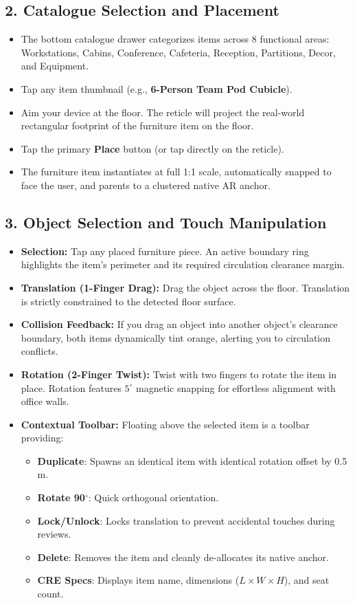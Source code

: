 \documentclass[11pt,a4paper]{article}
\begin{document}
\subsection{2. Catalogue Selection and Placement}
\begin{itemize}
    \item The bottom catalogue drawer categorizes items across 8 functional areas: Workstations, Cabins, Conference, Cafeteria, Reception, Partitions, Decor, and Equipment.
    \item Tap any item thumbnail (e.g., \textbf{6-Person Team Pod Cubicle}).
    \item Aim your device at the floor. The reticle will project the real-world rectangular footprint of the furniture item on the floor.
    \item Tap the primary \textbf{Place} button (or tap directly on the reticle).
    \item The furniture item instantiates at full 1:1 scale, automatically snapped to face the user, and parents to a clustered native AR anchor.
\end{itemize}

\subsection{3. Object Selection and Touch Manipulation}
\begin{itemize}
    \item \textbf{Selection:} Tap any placed furniture piece. An active boundary ring highlights the item's perimeter and its required circulation clearance margin.
    \item \textbf{Translation (1-Finger Drag):} Drag the object across the floor. Translation is strictly constrained to the detected floor surface.
    \item \textbf{Collision Feedback:} If you drag an object into another object's clearance boundary, both items dynamically tint orange, alerting you to circulation conflicts.
    \item \textbf{Rotation (2-Finger Twist):} Twist with two fingers to rotate the item in place. Rotation features $5^\circ$ magnetic snapping for effortless alignment with office walls.
    \item \textbf{Contextual Toolbar:} Floating above the selected item is a toolbar providing:
    \begin{itemize}[noitemsep]
        \item \textbf{Duplicate}: Spawns an identical item with identical rotation offset by 0.5\,m.
        \item \textbf{Rotate 90$^\circ$}: Quick orthogonal orientation.
        \item \textbf{Lock/Unlock}: Locks translation to prevent accidental touches during reviews.
        \item \textbf{Delete}: Removes the item and cleanly de-allocates its native anchor.
        \item \textbf{CRE Specs}: Displays item name, dimensions ($L \times W \times H$), and seat count.
    \end{itemize}
\end{itemize}
\end{document}
